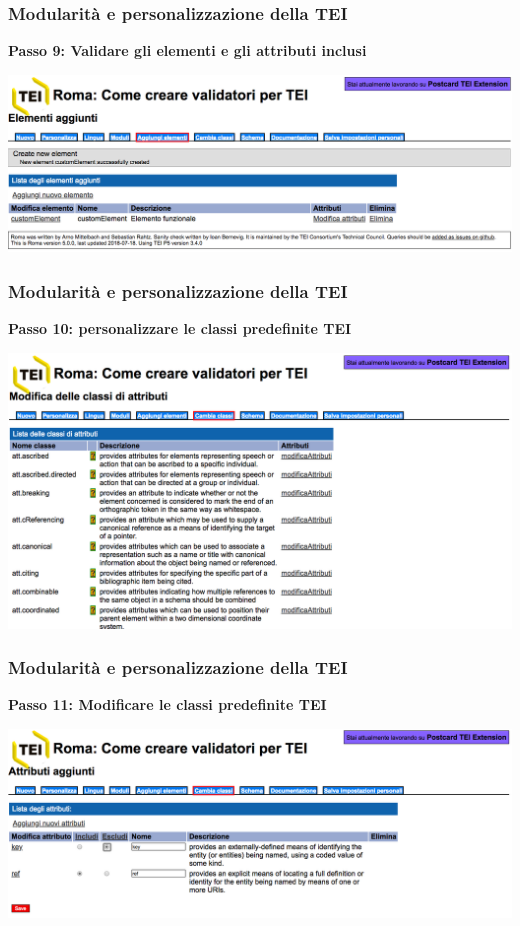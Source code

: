 \begin{frame}
    \frametitle{Modularità e personalizzazione della TEI}
    \addtocounter{nframe}{1}

    \textbf{Passo 9: Validare gli elementi e gli attributi inclusi}

     \begin{center}
        \includegraphics[width=.9\textwidth]{imgs/Roma8.png}
     \end{center}
   
    
\end{frame}


\begin{frame}
    \frametitle{Modularità e personalizzazione della TEI}
    \addtocounter{nframe}{1}
    
    \textbf{Passo 10: personalizzare le classi predefinite TEI }

     \begin{center}
        \includegraphics[width=.9\textwidth]{imgs/Roma10.png}
     \end{center}
   
    
\end{frame}

\begin{frame}
    \frametitle{Modularità e personalizzazione della TEI}
    \addtocounter{nframe}{1}
    
    \textbf{Passo 11: Modificare le classi predefinite TEI}

     \begin{center}
        \includegraphics[width=.9\textwidth]{imgs/Roma11.png}
     \end{center}
   
    
\end{frame}

